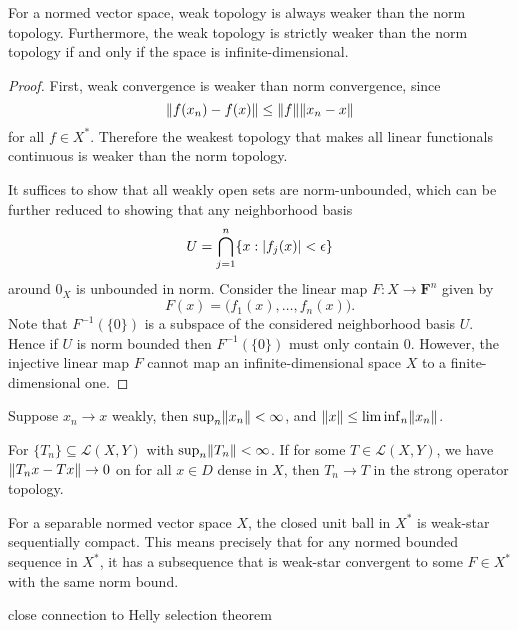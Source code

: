 \begin{prop}
    For a normed vector space, weak topology is always weaker than the norm topology. Furthermore, the weak topology is strictly weaker than the norm topology if and only if the space is infinite-dimensional.
\end{prop}
\begin{proof}
    First, weak convergence is weaker than norm convergence, since \[\lVert f(x_n) - f(x) \rVert \leq \lVert f \rVert\lVert x_n - x \rVert\] for all $f \in X^*$. Therefore the weakest topology that makes all linear functionals continuous is weaker than the norm topology.
    
    It suffices to show that all weakly open sets are norm-unbounded, which can be further reduced to showing that any neighborhood basis \[
        U = \bigcap_{j=1}^n \{x: \lvert f_j(x) \rvert < \epsilon\}
    \] around $0_X$ is unbounded in norm. Consider the linear map $F\colon X \to \mathbf F^n$ given by \[
        F(x) = \bigl(f_1(x),\dotsc,f_n(x)\bigr).
    \] Note that $F^{-1}(\{0\})$ is a subspace of the considered neighborhood basis $U$. Hence if $U$ is norm bounded then $F^{-1}(\{0\})$ must only contain $0$. However, the injective linear map $F$ cannot map an infinite-dimensional space $X$ to a finite-dimensional one.
\end{proof}

\begin{prop}
    Suppose $x_n \to x$ weakly, then $\sup_n \lVert x_n \rVert <\infty$, and $\lVert x \rVert \leq \liminf_n \lVert x_n \rVert$.
\end{prop}

\begin{prop} \label{prop:strong-op-top-dense-subset}
    For $\{T_n\} \subseteq \mathcal L(X,Y)$ with $\sup_n \lVert T_n \rVert < \infty$. If for some $T \in \mathcal L(X,Y)$, we have $\lVert T_n x - Tx \rVert \to 0$ on for all $x \in D$ dense in $X$, then $T_n \to T$ in the strong operator topology.
\end{prop}

\begin{namedthm} \label{thm:seq-Alaoglu}
    For a separable normed vector space $X$, the closed unit ball in $X^*$ is weak-star sequentially compact. This means precisely that for any normed bounded sequence in $X^*$, it has a subsequence that is weak-star convergent to some $F \in X^*$ with the same norm bound.
\end{namedthm}

close connection to Helly selection theorem

